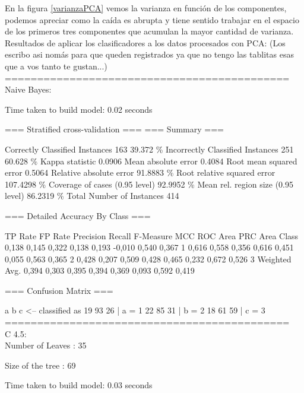 \documentclass[12pt,a4paper,titlepage]{report}
\begin{document}
En la figura \ref{varianzaPCA} vemos la varianza en función de los componentes, podemos apreciar como la caída es abrupta y tiene sentido trabajar en el espacio de los primeros tres componentes que acumulan la mayor cantidad de varianza.\\

Resultados de aplicar los clasificadores a los datos procesados con PCA: (Los escribo asi nomás para que queden registrados ya que no tengo las tablitas esas que a vos tanto te gustan...)\\

============================================\\
Naive Bayes:

Time taken to build model: 0.02 seconds

=== Stratified cross-validation ===
=== Summary ===

Correctly Classified Instances         163               39.372  \%
Incorrectly Classified Instances       251               60.628  \%
Kappa statistic                          0.0906
Mean absolute error                      0.4084
Root mean squared error                  0.5064
Relative absolute error                 91.8883 \%
Root relative squared error            107.4298 \%
Coverage of cases (0.95 level)          92.9952 \%
Mean rel. region size (0.95 level)      86.2319 \%
Total Number of Instances              414     

=== Detailed Accuracy By Class ===

                 TP Rate  FP Rate  Precision  Recall   F-Measure  MCC      ROC Area  PRC Area  Class
                 0,138    0,145    0,322      0,138    0,193      -0,010   0,540     0,367     1
                 0,616    0,558    0,356      0,616    0,451      0,055    0,563     0,365     2
                 0,428    0,207    0,509      0,428    0,465      0,232    0,672     0,526     3
Weighted Avg.    0,394    0,303    0,395      0,394    0,369      0,093    0,592     0,419     

=== Confusion Matrix ===

  a  b  c   <-- classified as
 19 93 26 |  a = 1
 22 85 31 |  b = 2
 18 61 59 |  c = 3
============================================\\
C 4.5:\\

Number of Leaves  : 	35

Size of the tree : 	69


Time taken to build model: 0.03 seconds
\end{document}
